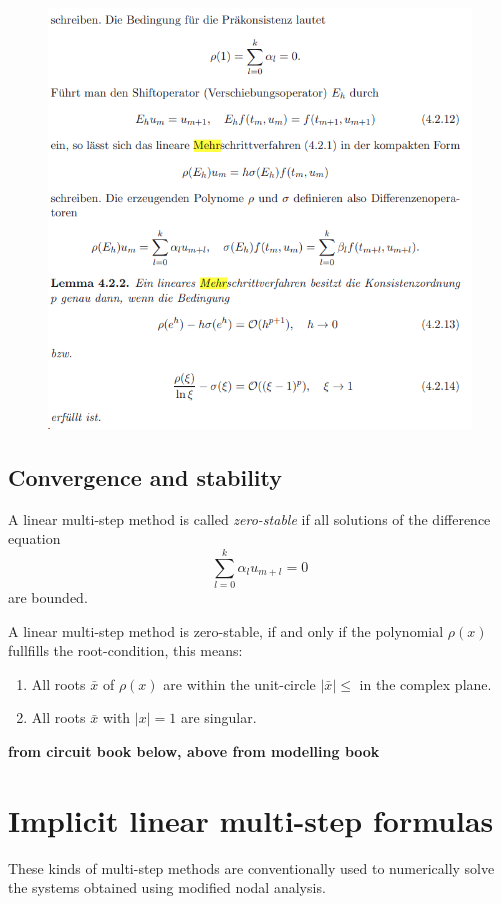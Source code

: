 \begin{figure}[H]
	\centering
	\includegraphics[width=0.7\linewidth]{screenshot014}
	\caption{}
	\label{fig:screenshot014}
\end{figure}



\subsection{Convergence and stability}

\begin{definition}
	A linear multi-step method is called \emph{zero-stable} if all solutions of the difference equation
	\begin{displaymath}
		\sum_{l=0}^{k} \alpha_l u_{m+l} = 0
	\end{displaymath}
	are bounded.
\end{definition}

\begin{theorem}
	A linear multi-step method is zero-stable, if and only if the polynomial $\rho(x)$ fullfills the root-condition, this means:
	\begin{enumerate}
		\item All roots $\bar{x}$ of $\rho(x)$ are within the unit-circle $|\bar{x}| \leq$ in the complex plane.
		\item All roots $\bar{x}$ with $|x| = 1$ are singular.
	\end{enumerate}
\end{theorem}


\textbf{from circuit book below, above from modelling book}

\section{Implicit linear multi-step formulas}
These kinds of multi-step methods are conventionally used to numerically solve the systems obtained using modified nodal analysis. 

